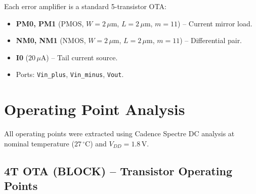 \documentclass[12pt,a4paper]{article}
\begin{document}
Each error amplifier is a standard 5-transistor OTA:

\begin{itemize}[leftmargin=1.5em]
  \item \textbf{PM0, PM1} (PMOS, $W=2\,\mu$m, $L=2\,\mu$m, $m=11$) -- Current mirror load.
  \item \textbf{NM0, NM1} (NMOS, $W=2\,\mu$m, $L=2\,\mu$m, $m=11$) -- Differential pair.
  \item \textbf{I0} ($20\,\mu\text{A}$) -- Tail current source.
  \item Ports: \texttt{Vin\_plus}, \texttt{Vin\_minus}, \texttt{Vout}.
\end{itemize}

\section{Operating Point Analysis}

All operating points were extracted using Cadence Spectre DC analysis at nominal temperature
($27\,^\circ$C) and $V_{DD} = 1.8\,\text{V}$.

\subsection{4T OTA (BLOCK) -- Transistor Operating Points}
\end{document}
